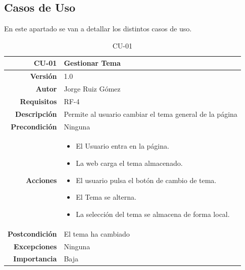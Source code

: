 \subsection{Casos de Uso}

En este apartado se van a detallar los distintos casos de uso. 

\begin{table}[H]
    \centering
    \begin{tabular}{r|p{}}
    \hline
    \textbf{CU-01}         & \textbf{Gestionar Tema}                                 \\ \hline
    \textbf{Versión}       & 1.0                                                     \\
    \textbf{Autor}         & Jorge Ruiz Gómez                                        \\
    \textbf{Requisitos}    & RF-4                                         \\
    \textbf{Descripción}   & Permite al usuario cambiar el tema general de la página \\ \hline
    \textbf{Precondición}  & Ninguna                                                 \\
    \textbf{Acciones}      &    \begin{itemize}
                                    \item El Usuario entra en la página.
                                    \item La web carga el tema almacenado.
                                    \item El usuario pulsa el botón de cambio de tema.
                                    \item El Tema se alterna.
                                    \item La selección del tema se almacena de forma local.
                                \end{itemize}\\
                                                                              
    \textbf{Postcondición} & El tema ha cambiado                                     \\
    \textbf{Excepciones}   & Ninguna                                                 \\
    \textbf{Importancia}   & Baja                                                    \\ \hline
    \end{tabular}
    \caption{CU-01}
    \label{tab:my-table}
\end{table}


